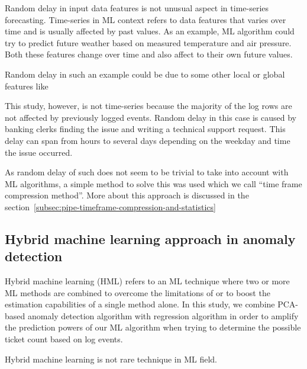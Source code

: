 Random delay in input data features
is not unusual aspect in time-series forecasting.
Time-series in ML context
refers to data features that varies over time
and is usually affected by past values.
As an example,
ML algorithm could try to predict future weather
based on measured temperature and air pressure.
Both these features change over time
and also affect to their own future values.

Random delay in such an example
could be due to some other local or global features
like

This study, however,
is not time-series
because the majority of the log rows
are not affected by previously logged events.
Random delay in this case
is caused by banking clerks
finding the issue and writing a technical support request.
This delay can span from hours to several days
depending on the weekday and time the issue occurred.


As random delay of such
does not seem to be trivial to take into account
with ML algorithms, %
a simple method to solve this was used
which we call \enquote{time frame compression method}.
More about this approach is discussed in the section~\ref{subsec:pipe-timeframe-compression-and-statistics}



\subsection{Hybrid machine learning approach in anomaly detection}\label{subsec:bg-hybrid-ml-approach-with-anomaly-detection}

Hybrid machine learning (HML)
refers to an ML technique
where two or more ML methods are combined
to overcome the limitations of
or to boost the estimation capabilities of
a single method alone.\cite{Anifowose2020hml}
In this study,
we combine PCA-based anomaly detection algorithm
with regression algorithm
in order to amplify the prediction powers of our ML algorithm
when trying to determine the possible ticket count
based on log events.

Hybrid machine learning is not rare technique in ML field.\cite{shon2007hybrid,tsai2010credit,mohan2019effective,
    hsieh2005hybrid,jain2007hybrid,kim2007hybrid,lee2002credit,malhotra2002differentiating}

